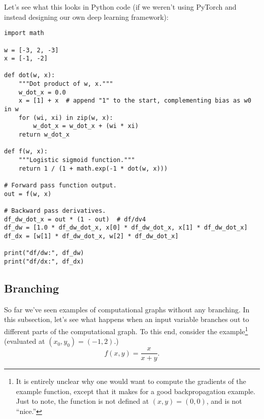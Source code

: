 Let's see what this looks in Python code (if we weren't using PyTorch and instead designing our own deep learning framework):
\begin{lstlisting}
import math

w = [-3, 2, -3]
x = [-1, -2]

def dot(w, x):
    """Dot product of w, x."""
    w_dot_x = 0.0
    x = [1] + x  # append "1" to the start, complementing bias as w0 in w
    for (wi, xi) in zip(w, x):
        w_dot_x = w_dot_x + (wi * xi) 
    return w_dot_x

def f(w, x):
    """Logistic sigmoid function."""
    return 1 / (1 + math.exp(-1 * dot(w, x)))

# Forward pass function output.
out = f(w, x)

# Backward pass derivatives.
df_dw_dot_x = out * (1 - out)  # df/dv4
df_dw = [1.0 * df_dw_dot_x, x[0] * df_dw_dot_x, x[1] * df_dw_dot_x]
df_dx = [w[1] * df_dw_dot_x, w[2] * df_dw_dot_x]

print("df/dw:", df_dw)
print("df/dx:", df_dx)
\end{lstlisting}

\subsection{Branching}
\label{sec:3.3}

So far we've seen examples of computational graphs without any branching. In this subsection, let's see what happens when an input variable branches out to different parts of the computational graph. To this end, consider the example\footnote{It is entirely unclear why one would want to compute the gradients of the example function, except that it makes for a good backpropagation example. Just to note, the function is not defined at $(x, y) = (0, 0)$, and is not ``nice.''} (evaluated at $(x_0, y_0) = (-1, 2)$.)
$$
f(x, y) = \frac{x}{x+y}.
$$

